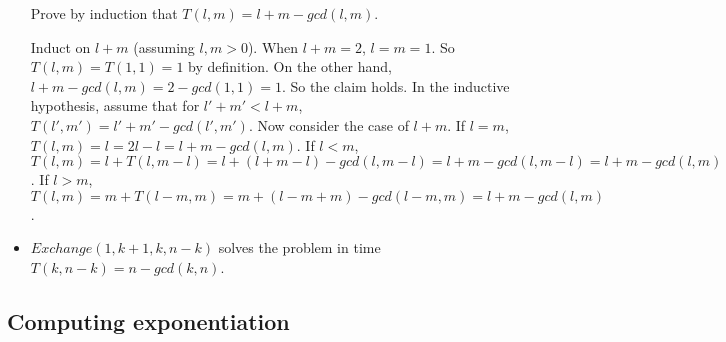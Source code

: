 \documentclass{article}
\begin{document}
\begin{itemize}
Prove by induction that $T(l,m)=l+m-gcd(l,m)$.

Induct on $l+m$ (assuming $l,m>0$). When $l+m=2$, $l=m=1$.
So $T(l,m)=T(1,1)=1$ by definition. On the other hand, 
$l+m-gcd(l,m)=2-gcd(1,1)=1$. So the claim holds. In the
inductive hypothesis, assume that for $l'+m'<l+m$,
$T(l',m')=l'+m'-gcd(l',m')$. Now consider the case of 
$l+m$. If $l=m$, $T(l,m)=l=2l-l=l+m-gcd(l,m)$. If $l<m$,
$T(l,m)=l+T(l,m-l)=l+(l+m-l)-gcd(l,m-l)=l+m-gcd(l,m-l)
=l+m-gcd(l,m)$. If $l>m$, $T(l,m)=m+T(l-m,m)=m+(l-m+m)-gcd(l-m,m)
=l+m-gcd(l,m)$.

\item $Exchange(1,k+1,k,n-k)$ solves the problem in time
$T(k,n-k)=n-gcd(k,n)$.

\end{itemize}

\subsection{Computing exponentiation}
\end{document}
